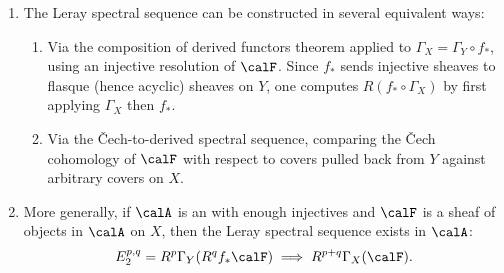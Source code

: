 \begin{definition}
\begin{enumerate}
    \item The Leray spectral sequence can be constructed in several equivalent ways:
    \begin{enumerate}
        \item Via the composition of derived functors theorem applied to $\Gamma_X = \Gamma_Y \circ f_*$, using an injective resolution of $\calF$. Since $f_*$ sends injective sheaves to flasque (hence acyclic) sheaves on $Y$, one computes $R(f_* \circ \Gamma_X)$ by first applying $\Gamma_X$ then $f_*$.
        \item Via the Čech-to-derived spectral sequence, comparing the Čech cohomology of $\calF$ with respect to covers pulled back from $Y$ against arbitrary covers on $X$.
    \end{enumerate}

    \item More generally, if $\calA$ is an  with enough injectives and $\calF$ is a sheaf of objects in $\calA$ on $X$, then the Leray spectral sequence exists in $\calA$:
    $$ E_2^{p,q} = R^p \Gamma_Y(R^q f_* \calF) \implies R^{p+q} \Gamma_X(\calF). $$
\end{enumerate}

\end{definition}
